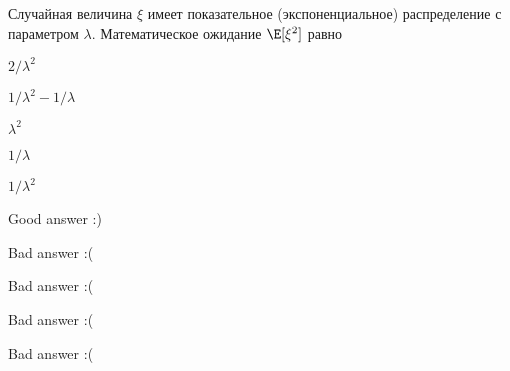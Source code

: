 
\begin{question}
Случайная величина \(\xi\) имеет показательное (экспоненциальное)
распределение с параметром \(\lambda\). Математическое ожидание
\(\E[\xi^2]\) равно
\begin{answerlist}
  \item \(2/\lambda^2\)
  \item \(1/\lambda^2 - 1/ \lambda\)
  \item \(\lambda^2\)
  \item \(1/\lambda\)
  \item \(1/\lambda^2\)
\end{answerlist}
\end{question}

\begin{solution}
\begin{answerlist}
  \item Good answer :)
  \item Bad answer :(
  \item Bad answer :(
  \item Bad answer :(
  \item Bad answer :(
\end{answerlist}
\end{solution}

